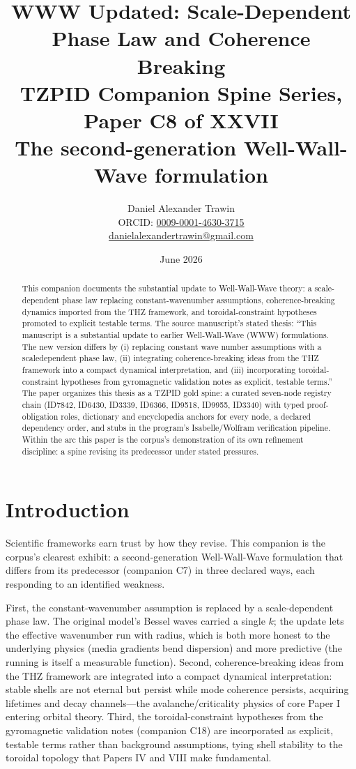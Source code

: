 \documentclass[11pt]{article}
\title{WWW Updated: Scale-Dependent Phase Law and Coherence Breaking\\[0.6em]
\large TZPID Companion Spine Series, Paper C8 of XXVII\\
\normalsize The second-generation Well-Wall-Wave formulation}
\author{Daniel Alexander Trawin\\
\small ORCID: \href{https://orcid.org/0009-0001-4630-3715}{0009-0001-4630-3715}\\
\small \href{mailto:danielalexandertrawin@gmail.com}{danielalexandertrawin@gmail.com}}
\date{June 2026}
\theoremstyle{remark}
\begin{document}
\maketitle

\begin{abstract}
This companion documents the substantial update to Well-Wall-Wave theory: a scale-dependent phase law replacing constant-wavenumber assumptions, coherence-breaking dynamics imported from the THZ framework, and toroidal-constraint hypotheses promoted to explicit testable terms.
The source manuscript's stated thesis: ``This manuscript is a substantial update to earlier Well-Wall-Wave (WWW) formulations. The new version differs by (i) replacing constant wave number assumptions with a scaledependent phase law, (ii) integrating coherence-breaking ideas from the THZ framework into a compact dynamical interpretation, and (iii) incorporating toroidal-constraint hypotheses from gyromagnetic validation notes as explicit, testable terms.'' The paper organizes this thesis as a TZPID gold spine: a curated seven-node registry chain (ID7842, ID6430, ID3339, ID6366, ID9518, ID9955, ID3340) with typed proof-obligation roles, dictionary and encyclopedia anchors for every node, a declared dependency order, and stubs in the program's Isabelle/Wolfram verification pipeline. Within the arc this paper is the corpus's demonstration of its own refinement discipline: a spine revising its predecessor under stated pressures.
\end{abstract}

\section{Introduction}
\label{sec:intro}

Scientific frameworks earn trust by how they revise. This companion is the corpus's clearest exhibit: a second-generation Well-Wall-Wave formulation that differs from its predecessor (companion C7) in three declared ways, each responding to an identified weakness.

First, the constant-wavenumber assumption is replaced by a scale-dependent phase law. The original model's Bessel waves carried a single $k$; the update lets the effective wavenumber run with radius, which is both more honest to the underlying physics (media gradients bend dispersion) and more predictive (the running is itself a measurable function). Second, coherence-breaking ideas from the THZ framework are integrated into a compact dynamical interpretation: stable shells are not eternal but persist while mode coherence persists, acquiring lifetimes and decay channels---the avalanche/criticality physics of core Paper I entering orbital theory. Third, the toroidal-constraint hypotheses from the gyromagnetic validation notes (companion C18) are incorporated as explicit, testable terms rather than background assumptions, tying shell stability to the toroidal topology that Papers IV and VIII make fundamental.
\end{document}
